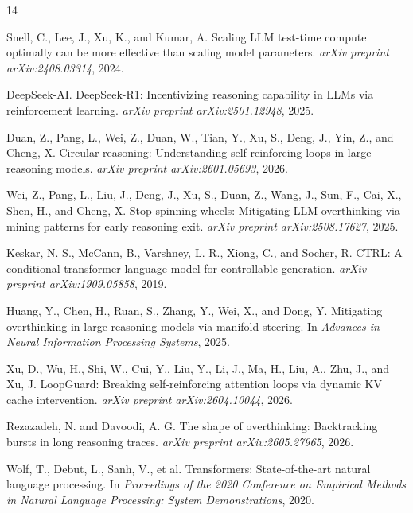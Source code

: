 \documentclass[11pt]{article}
\begin{document}
\begin{thebibliography}{14}\small
\setlength{\itemsep}{0.45em}

Snell, C., Lee, J., Xu, K., and Kumar, A.
Scaling LLM test-time compute optimally can be more effective than scaling model parameters.
\emph{arXiv preprint arXiv:2408.03314}, 2024.

DeepSeek-AI.
DeepSeek-R1: Incentivizing reasoning capability in LLMs via reinforcement learning.
\emph{arXiv preprint arXiv:2501.12948}, 2025.

Duan, Z., Pang, L., Wei, Z., Duan, W., Tian, Y., Xu, S., Deng, J., Yin, Z., and Cheng, X.
Circular reasoning: Understanding self-reinforcing loops in large reasoning models.
\emph{arXiv preprint arXiv:2601.05693}, 2026.

Wei, Z., Pang, L., Liu, J., Deng, J., Xu, S., Duan, Z., Wang, J., Sun, F., Cai, X., Shen, H., and Cheng, X.
Stop spinning wheels: Mitigating LLM overthinking via mining patterns for early reasoning exit.
\emph{arXiv preprint arXiv:2508.17627}, 2025.

Keskar, N. S., McCann, B., Varshney, L. R., Xiong, C., and Socher, R.
CTRL: A conditional transformer language model for controllable generation.
\emph{arXiv preprint arXiv:1909.05858}, 2019.

Huang, Y., Chen, H., Ruan, S., Zhang, Y., Wei, X., and Dong, Y.
Mitigating overthinking in large reasoning models via manifold steering.
In \emph{Advances in Neural Information Processing Systems}, 2025.

Xu, D., Wu, H., Shi, W., Cui, Y., Liu, Y., Li, J., Ma, H., Liu, A., Zhu, J., and Xu, J.
LoopGuard: Breaking self-reinforcing attention loops via dynamic KV cache intervention.
\emph{arXiv preprint arXiv:2604.10044}, 2026.

Rezazadeh, N. and Davoodi, A. G.
The shape of overthinking: Backtracking bursts in long reasoning traces.
\emph{arXiv preprint arXiv:2605.27965}, 2026.

Wolf, T., Debut, L., Sanh, V., et al.
Transformers: State-of-the-art natural language processing.
In \emph{Proceedings of the 2020 Conference on Empirical Methods in Natural Language Processing: System Demonstrations}, 2020.


\end{thebibliography}
\end{document}
